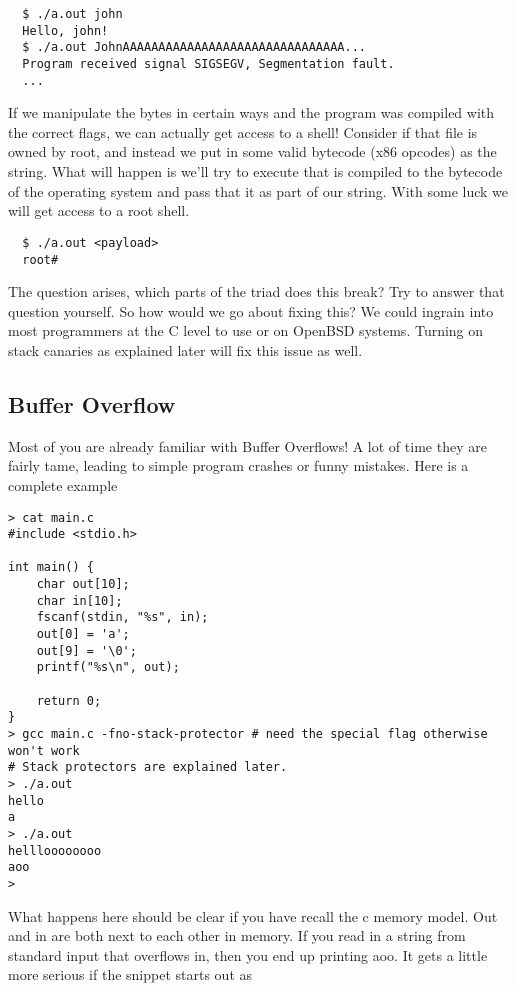 \begin{lstlisting}
  $ ./a.out john
  Hello, john!
  $ ./a.out JohnAAAAAAAAAAAAAAAAAAAAAAAAAAAAAAA...
  Program received signal SIGSEGV, Segmentation fault.
  ...
\end{lstlisting}

If we manipulate the bytes in certain ways and the program was compiled with the correct flags, we can actually get access to a shell!
Consider if that file is owned by root, and instead we put in some valid bytecode (x86 opcodes) as the string.
What will happen is we'll try to execute  that is compiled to the bytecode of the operating system and pass that it as part of our string.
With some luck we will get access to a root shell.

\begin{lstlisting}
  $ ./a.out <payload>
  root#
\end{lstlisting}

The question arises, which parts of the triad does this break?
Try to answer that question yourself.
So how would we go about fixing this?
We could ingrain into most programmers at the C level to use  or  on OpenBSD systems.
Turning on stack canaries as explained later will fix this issue as well.

\subsection{Buffer Overflow}

Most of you are already familiar with Buffer Overflows!
A lot of time they are fairly tame, leading to simple program crashes or funny mistakes.
Here is a complete example

\begin{lstlisting}
> cat main.c
#include <stdio.h>

int main() {
    char out[10];
    char in[10];
    fscanf(stdin, "%s", in);
    out[0] = 'a';
    out[9] = '\0';
    printf("%s\n", out);

    return 0;
}
> gcc main.c -fno-stack-protector # need the special flag otherwise won't work
# Stack protectors are explained later.
> ./a.out
hello
a
> ./a.out
hellloooooooo
aoo
>
\end{lstlisting}

What happens here should be clear if you have recall the c memory model.
Out and in are both next to each other in memory.
If you read in a string from standard input that overflows in, then you end up printing aoo.
It gets a little more serious if the snippet starts out as

